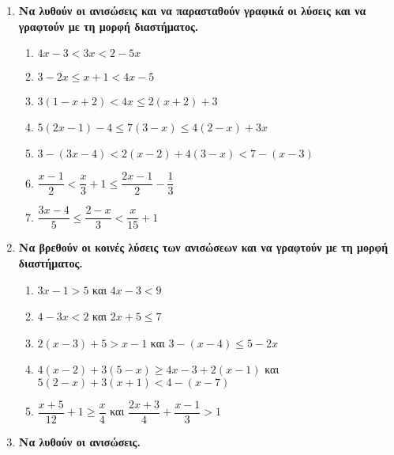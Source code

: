 \documentclass[twoside,nofonts,internet]{askhseis}
\begin{document}
\begin{enumerate}[label=\bf\textcolor{black}{{\large \arabic*.}},
itemsep=5mm]
\begin{multicols}{2}
\begin{enumerate}[label=\roman*.]
\item $ 2(x-3)+1<-3x+5(x-2) $
\item $ 4x-(3+2x)>5(x-2)+3(2-x)+1 $
\item $ 5-(x-2)+3x\leq3(2+x)-x-1 $
\item $ \dfrac{2x-3}{4}-\dfrac{x}{2}>1 $
\item $ \dfrac{3x-4}{5}-\dfrac{x-3}{3}\geq\dfrac{x-1}{15}+\dfrac{x-4}{5} $
\end{enumerate}
\end{multicols}
\item \textbf{Να λυθούν οι ανισώσεις και να παρασταθούν γραφικά οι λύσεις και να γραφτούν με τη μορφή διαστήματος.}
\begin{multicols}{2}
\begin{enumerate}[label=\roman*.]
\item $ 4x-3<3x<2-5x $
\item $ 3-2x\leq x+1<4x-5 $
\item $ 3(1-x+2)<4x\leq2(x+2)+3 $
\item $ 5(2x-1)-4\leq 7(3-x)\leq 4(2-x)+3x $
\item $ 3-(3x-4)<2(x-2)+4(3-x)<7-(x-3) $
\item $ \dfrac{x-1}{2}<\dfrac{x}{3}+1\leq\dfrac{2x-1}{2}-\dfrac{1}{3} $
\item $ \dfrac{3x-4}{5}\leq\dfrac{2-x}{3}<\dfrac{x}{15}+1 $
\end{enumerate}
\end{multicols}
\item \textbf{Να βρεθούν οι κοινές λύσεις των ανισώσεων και να γραφτούν με τη μορφή διαστήματος.}
\begin{multicols}{2}
\begin{enumerate}[label=\roman*.]
\item $ 3x-1>5 $ και $ 4x-3<9 $
\item $ 4-3x<2 $ και $ 2x+5\leq7 $
\item $ 2(x-3)+5>x-1 $ και $ 3-(x-4)\leq5-2x $
\vfill
\columnbreak
\vfill
\item $ 4(x-2)+3(5-x)\geq4x-3+2(x-1) $ και $ 5(2-x)+3(x+1)<4-(x-7) $
\item $ \dfrac{x+5}{12}+1\geq\dfrac{x}{4} $ και $ \dfrac{2x+3}{4}+\dfrac{x-1}{3}>1 $
\end{enumerate}
\end{multicols}
\item \textbf{Να λυθούν οι ανισώσεις.}
\begin{multicols}{4}
\begin{enumerate}[label=\roman*.]

\end{enumerate}
\end{multicols}
\end{enumerate}
\end{document}
